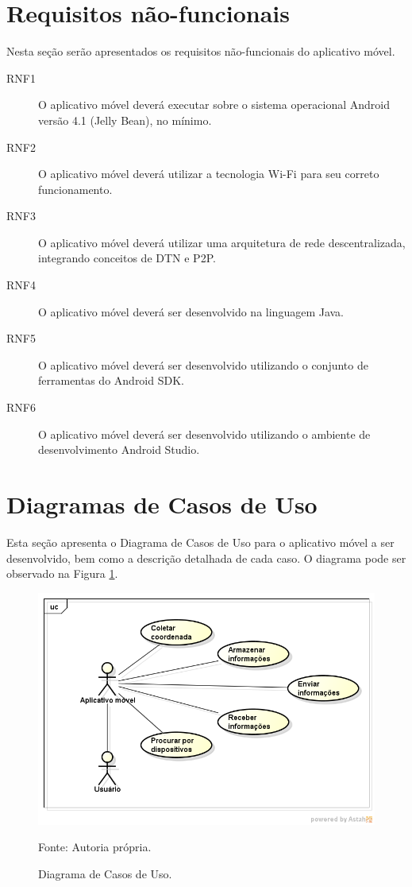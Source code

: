 \section{Requisitos não-funcionais}

Nesta seção serão apresentados os requisitos não-funcionais do aplicativo móvel.

\begin{description}
  \item[RNF1] O aplicativo móvel deverá executar sobre o sistema operacional Android versão 4.1 (Jelly Bean), no mínimo.
  \item[RNF2]  O aplicativo móvel deverá utilizar a tecnologia Wi-Fi para seu correto funcionamento.
  \item[RNF3] O aplicativo móvel deverá utilizar uma arquitetura de rede descentralizada, integrando conceitos de DTN e P2P.
  \item[RNF4] O aplicativo móvel deverá ser desenvolvido na linguagem Java.
  \item[RNF5] O aplicativo móvel deverá ser desenvolvido utilizando o conjunto de ferramentas do Android SDK.
  \item[RNF6] O aplicativo móvel deverá ser desenvolvido utilizando o ambiente de desenvolvimento Android Studio.
\end{description}

\newpage

\section{Diagramas de Casos de Uso}

Esta seção apresenta o Diagrama de Casos de Uso para o aplicativo móvel a ser desenvolvido, bem como a descrição detalhada de cada caso. O diagrama pode ser observado na Figura \ref{fig:uc}.

\begin{figure}[h]
\begin{center}
    \includegraphics[width=1\columnwidth]{../figs/uc_tcc.png}
    \caption{Diagrama de Casos de Uso.}Fonte: Autoria própria.%
    \label{fig:uc}
\end{center}
\end{figure}
